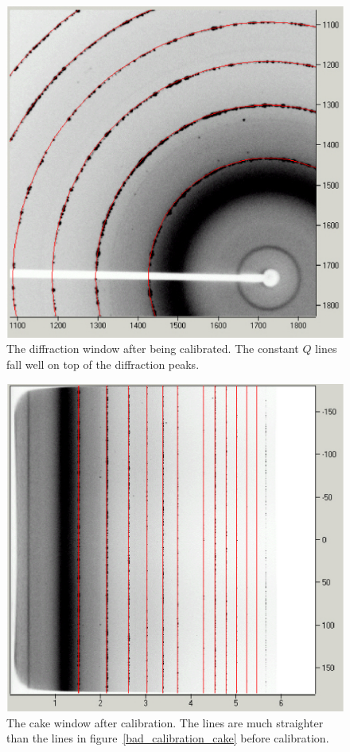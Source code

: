 \begin{figure}
    \centering
    \includegraphics[scale=.75]
    {figures/good_calibration_diffraction_image.eps}
    \caption{The diffraction window after being calibrated. The
    constant $Q$ lines fall well on top of the diffraction 
    peaks.}
    \label{good_calibration_diffraction_image}
\end{figure}

\begin{figure}
    \centering
    \includegraphics[scale=.75]
    {figures/good_calibration_cake.eps}
    \caption{The cake window after calibration.  The lines 
    are much straighter than the lines in 
    figure~\ref{bad_calibration_cake} before calibration.}
    \label{good_calibration_cake}
\end{figure}

